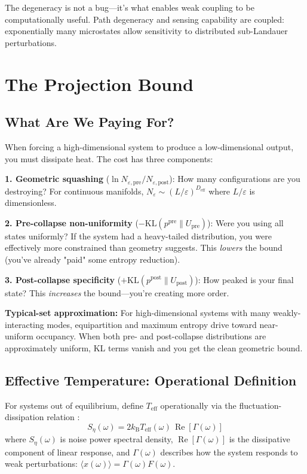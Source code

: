 \documentclass[12pt]{article}
\numberwithin{equation}{section}
\newcommand{\kB}{k_{\mathrm{B}}}
\newcommand{\Teff}{T_{\mathrm{eff}}}
\begin{document}
The degeneracy is not a bug—it's what enables weak coupling to be computationally useful. Path degeneracy and sensing capability are coupled: exponentially many microstates allow sensitivity to distributed sub-Landauer perturbations.

\section{The Projection Bound}

\subsection{What Are We Paying For?}

When forcing a high-dimensional system to produce a low-dimensional output, you must dissipate heat. The cost has three components:

\textbf{1. Geometric squashing} ($\ln N_{\varepsilon,\text{pre}}/N_{\varepsilon,\text{post}}$): How many configurations are you destroying? For continuous manifolds, $N_\varepsilon \sim (L/\varepsilon)^{D_{\text{eff}}}$ where $L/\varepsilon$ is dimensionless.

\textbf{2. Pre-collapse non-uniformity} ($-\text{KL}(p^{\text{pre}} \| U_{\text{pre}})$): Were you using all states uniformly? If the system had a heavy-tailed distribution, you were effectively more constrained than geometry suggests. This \emph{lowers} the bound (you've already "paid" some entropy reduction).

\textbf{3. Post-collapse specificity} ($+\text{KL}(p^{\text{post}} \| U_{\text{post}})$): How peaked is your final state? This \emph{increases} the bound—you're creating more order.

\textbf{Typical-set approximation:} For high-dimensional systems with many weakly-interacting modes, equipartition and maximum entropy drive toward near-uniform occupancy. When both pre- and post-collapse distributions are approximately uniform, KL terms vanish and you get the clean geometric bound.

\subsection{Effective Temperature: Operational Definition}

For systems out of equilibrium, define $\Teff$ operationally via the fluctuation-dissipation relation \cite{seifert2012}:
\begin{equation}
S_\eta(\omega) = 2 \kB \Teff(\omega)\, \operatorname{Re}[\Gamma(\omega)]
\end{equation}
where $S_\eta(\omega)$ is noise power spectral density, $\operatorname{Re}[\Gamma(\omega)]$ is the dissipative component of linear response, and $\Gamma(\omega)$ describes how the system responds to weak perturbations: $\langle x(\omega) \rangle = \Gamma(\omega) F(\omega)$.
\end{document}
